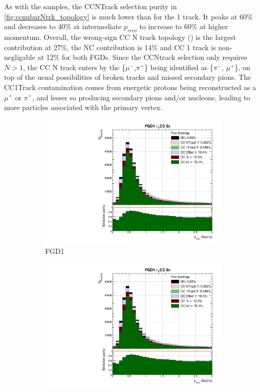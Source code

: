 As with the \numu samples, the CCNTrack selection purity in \autoref{fig:ccnubarNtrk_topology} is much lower than for the 1 track. It peaks at 60\% and decreases to 40\% at intermediate $p_{reco}$ to increase to 60\% at higher momentum. Overall, the wrong-sign CC N track topology (\numu) is the largest contribution at 27\%, the NC contribution is 14\% and \numubar CC 1 track is non-negligable at 12\% for both FGDs. Since the CCNtrack selection only requires $N>1$, the \numu CC N track enters by the \{$\mu^-$,$\pi^+$\} being identified as \{$\pi^-$, $\mu^+$\}, on top of the usual possibilities of broken tracks and missed secondary pions. The CC1Track contamination comes from energetic protons being reconstructed as a $\mu^+$ or $\pi^+$, and lesser so producing secondary pions and/or nucleons, leading to more particles associated with the primary vertex.
\begin{figure}[!h]
	\begin{subfigure}[t]{0.49\textwidth}
		\includegraphics[width=\textwidth,page=15, trim={0mm 0mm 0mm 9mm}, clip]{figures/mach3/selection/2017b_Diag_WithSelection}
		\caption{FGD1}
	\end{subfigure}
	\begin{subfigure}[t]{0.49\textwidth}
		\includegraphics[width=\textwidth,page=19, trim={0mm 0mm 0mm 9mm}, clip]{figures/mach3/selection/2017b_Diag_WithSelection}

\end{subfigure}
\end{figure}
